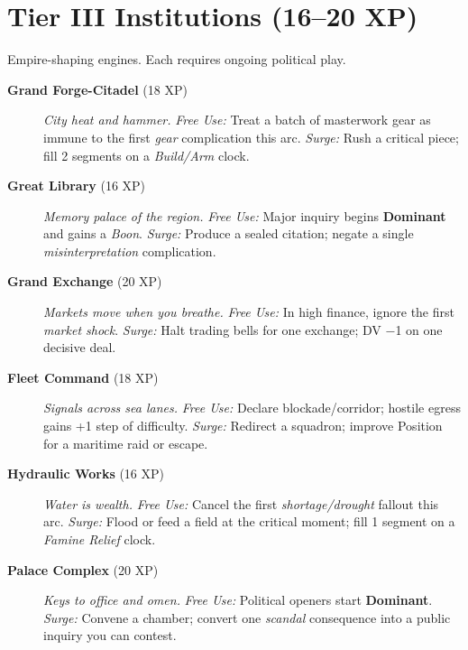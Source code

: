 \section{Tier III Institutions (16–20 XP)}
Empire-shaping engines. Each requires ongoing political play.
\begin{description}
  \item[\textbf{Grand Forge-Citadel} (18 XP)]  \emph{City heat and hammer.} \emph{Free Use:} Treat a batch of masterwork gear as immune to the first \emph{gear} complication this arc. \emph{Surge:} Rush a critical piece; fill 2 segments on a \emph{Build/Arm} clock.

  \item[\textbf{Great Library} (16 XP)]  \emph{Memory palace of the region.} \emph{Free Use:} Major inquiry begins \textbf{Dominant} and gains a \emph{Boon}. \emph{Surge:} Produce a sealed citation; negate a single \emph{misinterpretation} complication.

  \item[\textbf{Grand Exchange} (20 XP)]  \emph{Markets move when you breathe.} \emph{Free Use:} In high finance, ignore the first \emph{market shock}. \emph{Surge:} Halt trading bells for one exchange; DV −1 on one decisive deal.

  \item[\textbf{Fleet Command} (18 XP)]  \emph{Signals across sea lanes.} \emph{Free Use:} Declare blockade/corridor; hostile egress gains +1 step of difficulty. \emph{Surge:} Redirect a squadron; improve Position for a maritime raid or escape.

  \item[\textbf{Hydraulic Works} (16 XP)]  \emph{Water is wealth.} \emph{Free Use:} Cancel the first \emph{shortage/drought} fallout this arc. \emph{Surge:} Flood or feed a field at the critical moment; fill 1 segment on a \emph{Famine Relief} clock.

  \item[\textbf{Palace Complex} (20 XP)]  \emph{Keys to office and omen.} \emph{Free Use:} Political openers start \textbf{Dominant}. \emph{Surge:} Convene a chamber; convert one \emph{scandal} consequence into a public inquiry you can contest.
\end{description}

